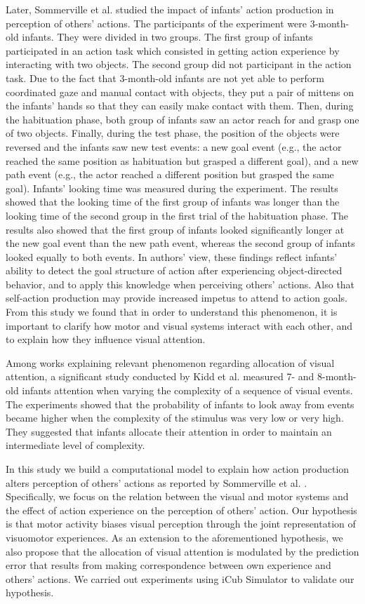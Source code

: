 \documentclass[conference]{IEEEtran}
\begin{document}
Later, Sommerville et al.\cite{sommerville2005action} studied the impact of infants' action production in perception of others' actions. The participants of the experiment were 3-month-old infants. They were divided in two groups. The first group of infants participated in an action task which consisted in getting action experience by interacting with two objects. The second group did not participant in the action task. Due to the fact that 3-month-old infants are not yet able to perform coordinated gaze and manual contact with objects, they put a pair of mittens on the infants’ hands so that they can easily make contact with them. Then, during the habituation phase, both group of infants saw an actor reach for and grasp one of two objects. Finally, during the test phase, the position of the objects were reversed and the infants saw new test events: a new goal event (e.g., the actor reached the same position as habituation but grasped a different goal), and a new path event (e.g., the actor reached a different position but grasped the same goal). Infants' looking time was measured during the experiment. The results showed that the looking time of the first group of infants was longer than the looking time of the second group in the first trial of the habituation phase. The results also showed that the first group of infants looked significantly longer at the new goal event than the new path event, whereas the second group of infants looked equally to both events. In authors' view, these findings reflect infants’ ability to detect the goal structure of action after experiencing object-directed behavior, and to apply this knowledge when perceiving others’ actions. Also that self-action production may provide increased impetus to attend to action goals. From this study we found that in order to understand this phenomenon, it is important to clarify how motor and visual systems interact with each other, and to explain how they influence visual attention.

Among works explaining relevant phenomenon regarding allocation of visual attention, a significant study conducted by Kidd et al. \cite{kidd2012goldilocks} measured 7- and 8-month-old infants attention when varying the complexity of a sequence of visual events. The experiments showed that the probability of infants to look away from events became higher when the complexity of the stimulus was very low or very high. They suggested that infants allocate their attention in order to maintain an intermediate level of complexity.

In this study we build a computational model to explain how action production alters perception of others’ actions as reported by Sommerville et al. \cite{sommerville2005action}. Specifically, we focus on the relation between the visual and motor systems and the effect of action experience on the perception of others’ action. Our hypothesis is that motor activity biases visual perception through the joint representation of visuomotor experiences. As an extension to the aforementioned hypothesis, we also propose that the allocation of visual attention is modulated by the prediction error that results from making correspondence between own experience and others' actions. We carried out experiments using iCub Simulator to validate our hypothesis.
\end{document}
